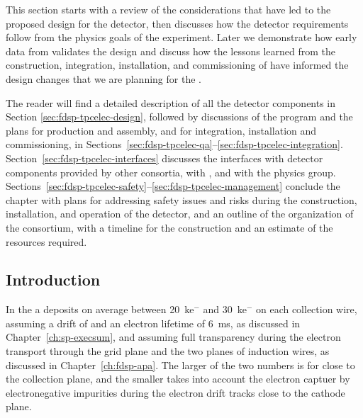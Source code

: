 This section starts with a review of the considerations that
have led to the proposed design for the   detector, 
then discusses how the detector requirements follow 
from the physics goals of the experiment.
Later we demonstrate how early data from  
validates the design and 
discuss how the lessons learned from the construction,
integration, installation, and commissioning of  have 
informed the design changes that we are planning for the 
.

The reader will find a detailed description of all the  detector 
components in Section \ref{sec:fdsp-tpcelec-design}, followed by discussions 
of the  program and the plans for production and assembly, 
and for integration, installation and commissioning, in 
Sections~\ref{sec:fdsp-tpcelec-qa}--\ref{sec:fdsp-tpcelec-integration}. 
Section~\ref{sec:fdsp-tpcelec-interfaces} discusses the interfaces with 
detector components provided by other consortia, with , and with the physics group. 
Sections~\ref{sec:fdsp-tpcelec-safety}--\ref{sec:fdsp-tpcelec-management} 
conclude the chapter with plans for addressing safety issues and risks during the
construction, installation, and operation of the detector, and 
an outline of the organization of the  consortium, 
with a timeline for the  construction and an estimate
of the resources required.

\subsection{Introduction}
\label{sec:fdsp-tpcelec-overview-intro}


In the   a  deposits on average between
\SI{20}{k}{e$^-$} and \SI{30}{k}{e$^-$} on each collection wire, assuming a drift \efield
of \spmaxfield and an electron lifetime of \SI{6}{ms}, as discussed in
Chapter~\ref{ch:sp-execsum}, and assuming full transparency during the 
electron transport through the grid plane and the two planes of induction
wires, as discussed in Chapter~\ref{ch:fdsp-apa}. The larger of the two numbers 
is for  close to the collection plane, and the smaller
takes into account the electron captuer by electronegative impurities during the electron
drift tracks close to the cathode plane. 


